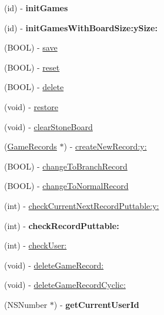 \begin{DoxyCompactItemize}
\item 
\hypertarget{interface_games_a01dfe628966c04670fedf35e02c33371}{
(id) -\/ {\bfseries initGames}}
\label{interface_games_a01dfe628966c04670fedf35e02c33371}

\item 
\hypertarget{interface_games_a430dea682d0d84b969200dd97dd2be98}{
(id) -\/ {\bfseries initGamesWithBoardSize:ySize:}}
\label{interface_games_a430dea682d0d84b969200dd97dd2be98}

\item 
(BOOL) -\/ \hyperlink{interface_games_ae1b6c93bf7add9a10162247a20065ae8}{save}
\item 
(BOOL) -\/ \hyperlink{interface_games_aca0584d71aeaf9cb5d3f0ee24e69fe24}{reset}
\item 
(BOOL) -\/ \hyperlink{interface_games_af8332c38140082709ec41bf91747c41f}{delete}
\item 
(void) -\/ \hyperlink{interface_games_a4c5e2dc4e111e48f56ecb8e94fb3cac1}{restore}
\item 
(void) -\/ \hyperlink{interface_games_ac3127f644ef9d8a28e87606f3d3dfabd}{clearStoneBoard}
\item 
(\hyperlink{interface_game_records}{GameRecords} $\ast$) -\/ \hyperlink{interface_games_af18902533c38f8bcf431406bf03745bb}{createNewRecord:y:}
\item 
(BOOL) -\/ \hyperlink{interface_games_ae4fe69c9a21bec384055e089ceac2829}{changeToBranchRecord}
\item 
(BOOL) -\/ \hyperlink{interface_games_a9ce3e100ef3c5624144c5447630b3a6e}{changeToNormalRecord}
\item 
(int) -\/ \hyperlink{interface_games_a3fb19a273e3591f2e8e61a9eee23d84c}{checkCurrentNextRecordPuttable:y:}
\item 
\hypertarget{interface_games_a6ebac07fc8659bbb8af5a5bc1201256f}{
(int) -\/ {\bfseries checkRecordPuttable:}}
\label{interface_games_a6ebac07fc8659bbb8af5a5bc1201256f}

\item 
(int) -\/ \hyperlink{interface_games_a0272aef1d669a1162b8025ff0eccd8df}{checkUser:}
\item 
(void) -\/ \hyperlink{interface_games_a19e7645f03f70e1215390106d8e5ff3a}{deleteGameRecord:}
\item 
(void) -\/ \hyperlink{interface_games_a66ef016bdf75662d0368b7726aca5fb3}{deleteGameRecordCyclic:}
\item 
\hypertarget{interface_games_a27c81a4af36aceb98772b9ac610e6135}{
(NSNumber $\ast$) -\/ {\bfseries getCurrentUserId}}
\label{interface_games_a27c81a4af36aceb98772b9ac610e6135}


\end{DoxyCompactItemize}
